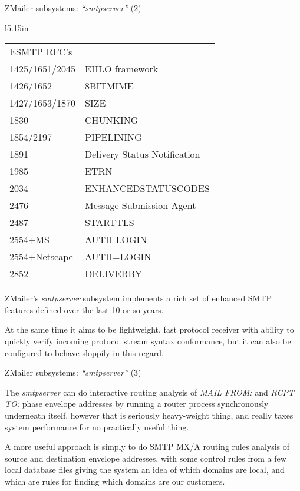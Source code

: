 \documentclass[a4paper,landscape]{slides}
\newcommand{\ZM}{ZMailer}
\begin{document}


\begin{slide}
\centerline{\large \ZM{} subsystems: {\em ``smtpserver''} (2)}

\begin{wrapfigure}[12]{l}{5.15in}
\tiny
\begin{tabular}{ll}
ESMTP RFC's \\

1425/1651/2045 & EHLO framework \\
1426/1652 & 8BITMIME \\
1427/1653/1870 & SIZE \\
1830 & CHUNKING \\
1854/2197 & PIPELINING \\
1891 & Delivery Status Notification \\
1985 & ETRN \\
2034 & ENHANCEDSTATUSCODES \\
2476 & Message Submission Agent \\
2487 & STARTTLS \\
2554+MS & AUTH LOGIN \\
2554+Netscape & AUTH=LOGIN \\
2852 & DELIVERBY \\
\end{tabular}
\end{wrapfigure}
\ZM's {\em smtpserver} subsystem implements a rich set of enhanced SMTP
features defined over the last 10 or so years.

At the same time it aims to be lightweight, fast protocol receiver with
ability to quickly verify incoming protocol stream syntax conformance,
but it can also be configured to behave sloppily in this regard.

\vfill
\end{slide}

\begin{slide}
\centerline{\large \ZM{} subsystems: {\em ``smtpserver''} (3)}

The {\em smtpserver} can do interactive routing analysis of
{\em MAIL FROM:} and {\em RCPT TO:} phase envelope addresses
by running a router process synchronously underneath itself,
however that is seriously heavy-weight thing, and really taxes
system performance for no practically useful thing.

A more useful approach is simply to do SMTP MX/A routing rules
analysis of source and destination envelope addresses, with
some control rules from a few local database files giving the
system an idea of which domains are local, and which are rules
for finding which domains are our customers.

\vfill
\end{slide}
\end{document}
